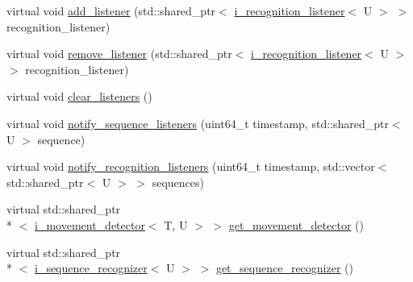 \begin{DoxyCompactItemize}
\item 
virtual void \hyperlink{classmae_1_1movement__controller_a80b292e1a12f916de2d167f22871c901}{add\-\_\-listener} (std\-::shared\-\_\-ptr$<$ \hyperlink{classmae_1_1i__recognition__listener}{i\-\_\-recognition\-\_\-listener}$<$ U $>$ $>$ recognition\-\_\-listener)
\item 
virtual void \hyperlink{classmae_1_1movement__controller_aafbffa6c9a0d2b73b2036f07c484b6cf}{remove\-\_\-listener} (std\-::shared\-\_\-ptr$<$ \hyperlink{classmae_1_1i__recognition__listener}{i\-\_\-recognition\-\_\-listener}$<$ U $>$ $>$ recognition\-\_\-listener)
\item 
virtual void \hyperlink{classmae_1_1movement__controller_adac2b632e8be6b8e2556005e79b187c3}{clear\-\_\-listeners} ()
\item 
virtual void \hyperlink{classmae_1_1movement__controller_a2bd72c0cb02311a7cddb4bd8898d8028}{notify\-\_\-sequence\-\_\-listeners} (uint64\-\_\-t timestamp, std\-::shared\-\_\-ptr$<$ U $>$ sequence)
\item 
virtual void \hyperlink{classmae_1_1movement__controller_af4bba61aefd94014f007192bf4b0da46}{notify\-\_\-recognition\-\_\-listeners} (uint64\-\_\-t timestamp, std\-::vector$<$ std\-::shared\-\_\-ptr$<$ U $>$ $>$ sequences)
\item 
virtual std\-::shared\-\_\-ptr\\*
$<$ \hyperlink{classmae_1_1i__movement__detector}{i\-\_\-movement\-\_\-detector}$<$ T, U $>$ $>$ \hyperlink{classmae_1_1movement__controller_ad3d0a125556f02ce12a2ca7faf5c1cf3}{get\-\_\-movement\-\_\-detector} ()
\item 
virtual std\-::shared\-\_\-ptr\\*
$<$ \hyperlink{classmae_1_1i__sequence__recognizer}{i\-\_\-sequence\-\_\-recognizer}$<$ U $>$ $>$ \hyperlink{classmae_1_1movement__controller_af7d0eaa65d7a64e5b8169fef192760f6}{get\-\_\-sequence\-\_\-recognizer} ()
\end{DoxyCompactItemize}


